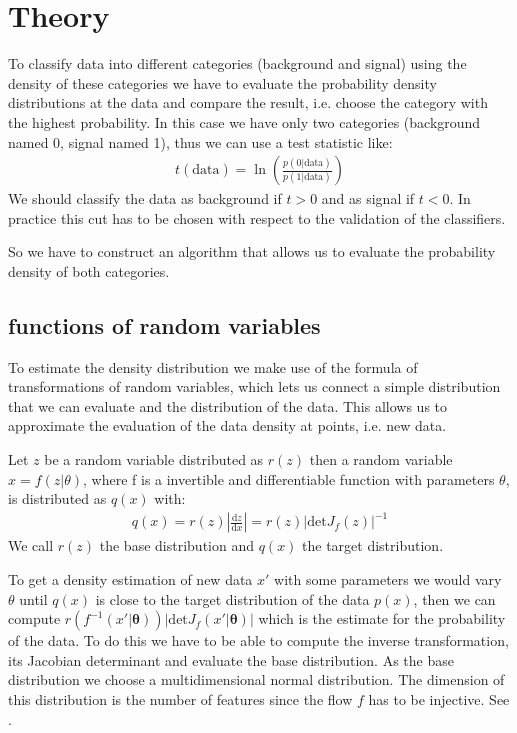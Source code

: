 \documentclass[%
 reprint,
 amsmath,amssymb,
 aps,
]{revtex4-2}
\begin{document}
\section{Theory}
\label{sec:theory 1}
To classify data into different categories (background and signal) using the density of these categories we have to evaluate the probability density distributions at the data and compare the result, i.e. choose the category with the highest probability. In this case we have only two categories (background named 0, signal named 1), thus we can use a test statistic like:
\begin{align*}
	t(\text{data}) = \ln(\frac{p(0|\text{data})}{p(1|\text{data})})
\end{align*}
We should classify the data as background if $t>0$ and as signal if $t<0$. In practice this cut has to be chosen with respect to the validation of the classifiers. 

So we have to construct an algorithm that allows us to evaluate the probability density of both categories. 
\subsection{functions of random variables}
To estimate the density distribution we make use of the formula of  transformations of random variables, which lets us connect a simple distribution that we can evaluate and the distribution of the data. This allows us to approximate the evaluation of the data density at points, i.e. new data. 

Let $z$ be a random variable distributed as $r(z)$ then a random variable $x = f(z|\theta)$, where f is a invertible and differentiable function with parameters $\theta$, is distributed as $q(x)$ with:
\begin{align*}
	q(x) = r(z)\left|\frac{\text{d} z}{\text{d} x}\right| = r(z)\left|\text{det}J_f(z)\right|^{-1}
\end{align*}
We call $r(z)$ the base distribution and $q(x)$ the target distribution.

To get a density estimation of new data $x'$ with some parameters we would vary $\theta$ until $q(x)$ is close to the target distribution of the data $p(x)$, then we can compute $r(f^{-1}(x'|\mathbf{\theta}))\left|\text{det}J_f(x'|\mathbf{\theta})\right|$ which is the estimate for the probability of the data. To do this we have to be able to compute the inverse transformation, its Jacobian determinant and evaluate the base distribution. As the base distribution we choose a multidimensional normal distribution. The dimension of this distribution is the number of features since the flow $f$ has to be injective. See \cite{JMLR:v22:19-1028}.
\end{document}
